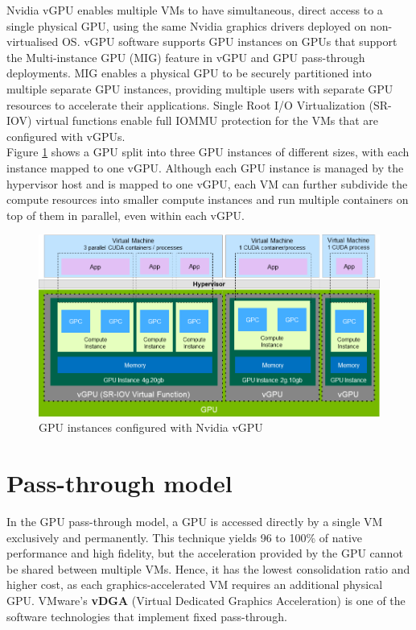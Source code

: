 \documentclass[a4paper,12pt, final]{report}
\begin{document}
\noindent Nvidia vGPU enables multiple VMs to have simultaneous, direct access to a single physical GPU, using the same Nvidia graphics drivers deployed on non-virtualised OS. vGPU software supports GPU instances on GPUs that support the Multi-instance GPU (MIG) feature in vGPU and GPU pass-through deployments. MIG enables a physical GPU to be securely partitioned into multiple separate GPU instances, providing multiple users with separate GPU resources to accelerate their applications. Single Root I/O Virtualization (SR-IOV) virtual functions enable full IOMMU protection for the VMs that are configured with vGPUs.\\

\noindent Figure \ref{fig:nvidia_vgpu_overview} shows a GPU split into three GPU instances of different sizes, with each instance mapped to one vGPU. Although each GPU instance is managed by the hypervisor host and is mapped to one vGPU, each VM can further subdivide the compute resources into smaller compute instances and run multiple containers on top of them in parallel, even within each vGPU.

\begin{figure}[H]
    \centering
    \includegraphics[width=\textwidth]{images/nvidia-vgpu-overview.png}
    \caption{GPU instances configured with Nvidia vGPU \cite{nvidia_vgpu_docs}}
    \label{fig:nvidia_vgpu_overview}
\end{figure}

\section{Pass-through model}
In the GPU pass-through model, a GPU is accessed directly by a single VM exclusively and permanently. This technique yields 96 to 100\% of native performance and high fidelity, but the acceleration provided by the GPU cannot be shared between multiple VMs. Hence, it has the lowest consolidation ratio and higher cost, as each graphics-accelerated VM requires an additional physical GPU. VMware's \textbf{vDGA} (Virtual Dedicated Graphics Acceleration) is one of the software technologies that implement fixed pass-through.
\end{document}
